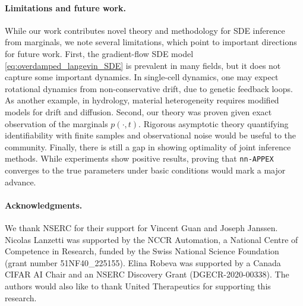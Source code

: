 \documentclass[twoside]{article}
\newcommand{\nappex}{\texttt{nn-APPEX}}
\begin{document}
\paragraph{Limitations and future work.}
While our work contributes novel theory and methodology for SDE inference from marginals, we note several limitations, which point to important directions for future work. First, the gradient-flow SDE model \eqref{eq:overdamped_langevin_SDE} is prevalent in many fields, but it does not capture some important dynamics. In single-cell dynamics, one may expect rotational dynamics from non-conservative drift, due to genetic feedback loops. As another example, in hydrology, material heterogeneity requires modified models for drift and diffusion. Second, our theory was proven given exact observation of the marginals $p(\cdot, t)$. Rigorous asymptotic theory quantifying identifiability with finite samples and observational noise would be useful to the community. Finally, there is still a gap in showing optimality of joint inference methods. While experiments show positive results, proving that \nappex{} converges to the true parameters under basic conditions would mark a major advance.

\paragraph{Acknowledgments.}

We thank NSERC for their support for Vincent Guan and Joseph Janssen. Nicolas Lanzetti was supported by the NCCR Automation, a National
Centre of Competence in Research, funded by the Swiss National Science
Foundation (grant number 51NF40\_225155). Elina Robeva was supported by a Canada CIFAR AI Chair and an NSERC Discovery Grant (DGECR-2020-00338). The authors would also like to thank United Therapeutics for supporting this research.




\end{document}
